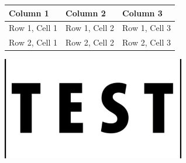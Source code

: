 \documentclass[a4paper]{article}
\begin{document}
\begin{tabular}{|l|l|l|}
\hline
Column 1 & Column 2 & Column 3 \\
\hline
Row 1, Cell 1 & Row 1, Cell 2 & Row 1, Cell 3 \\
\hline
Row 2, Cell 1 & Row 2, Cell 2 & Row 2, Cell 3 \\
\hline
\end{tabular}
\newline
\vspace{1em}
\includegraphics[width=8cm]{../test_data/test.jpg}
\end{document}
